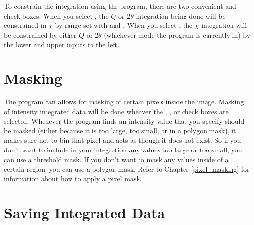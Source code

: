 To constrain the integration using the program,
there are two convenient 
 and 
 check boxes.
When you select
, the
$Q$ or $2\theta$ integration being done
will be constrained in $\chi$ by range
set with  and .
When you select
, the
$\chi$ integration will be constrained by
either $Q$ or $2\theta$ (whichever mode the
program is currently in) by the lower and
upper inputs to the left.

\section{Masking}

The program can allows for masking of certain
pixels inside the image. 
Masking of intensity integrated data will be done
whenver the
, ,
or  check boxes are selected.
Whenever the program finds an intensity value
that you specify should be masked (either because it 
is too large, too small, or in a polygon mask), it makes
sure not to bin that pixel and acts as though
it does not exist. So if you don't want to include
in your integration any values too large or too
small, you can use a threshold mask. If you
don't want to mask any values inside of a certain
region, you can use a polygon mask. 
Refer to Chapter \ref{pixel_masking} for information 
about how to apply a pixel mask.

\section{Saving Integrated Data}

